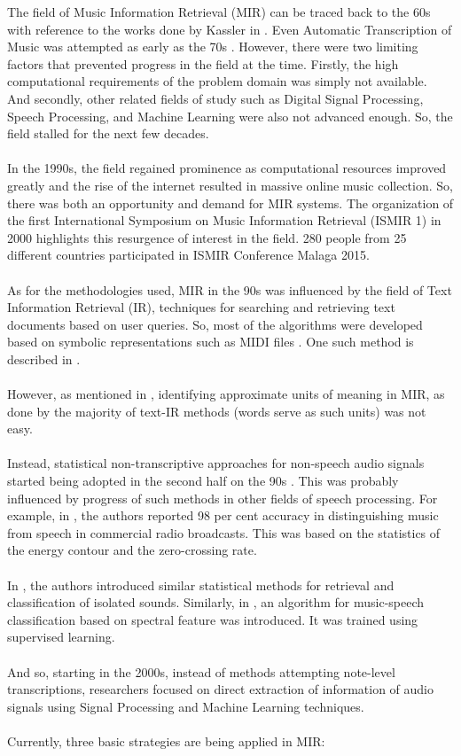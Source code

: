The field of Music Information Retrieval (MIR) can be traced back to the 60s with reference to the works done by Kassler in \cite{kassler1966}.
Even Automatic Transcription of Music was attempted as early as the 70s \cite{andel1975}. However, there were two limiting factors that prevented progress in the field at the time.
Firstly, the high computational requirements of the problem domain was simply not available. 
And secondly, other related fields of study such as Digital Signal Processing, Speech Processing, and Machine Learning were also not advanced enough.  
So, the field stalled for the next few decades.\\
\\
In the 1990s, the field regained prominence as computational resources improved greatly and the rise of the internet resulted in massive online music collection. So, there was both an opportunity and demand for MIR systems.
The organization of the first International Symposium on Music Information Retrieval (ISMIR 1) in 2000 highlights this resurgence of interest in the field. 
280 people from 25 different countries participated in ISMIR Conference Malaga 2015.\\
\\
As for the methodologies used, MIR in the 90s was influenced by the field of Text Information Retrieval (IR), techniques for searching and retrieving text documents based on user queries.
So, most of the algorithms were developed based on symbolic representations such as MIDI files \cite{Tzanetakis2002a}. One such method is described in \cite{alghoniemy1999}.\\
\\
However, as mentioned in \cite{byrd2002}, identifying approximate units of meaning in MIR, as done by the majority of text-IR methods (words serve as such units) was not easy.\\
\\
Instead, statistical non-transcriptive approaches for non-speech audio signals started being adopted in the second half on the 90s \cite{Tzanetakis2002a}.
This was probably influenced by progress of such methods in other fields of speech processing. 
For example, in \cite{saunders1996}, the authors reported 98 per cent accuracy in distinguishing music from speech in commercial radio broadcasts.
This was based on the statistics of the energy contour and the zero-crossing rate.\\
\\
In \cite{wold1996}, the authors introduced similar statistical methods for retrieval and classification of isolated sounds.
Similarly, in \cite{scheirer1997}, an algorithm for music-speech classification based on spectral feature was introduced. 
It was trained using supervised learning. \\
\\
And so, starting in the 2000s, instead of methods attempting note-level transcriptions, researchers focused on direct extraction of information of audio signals using Signal Processing and Machine Learning techniques.\\
\\
Currently, three basic strategies are being applied in MIR: \cite{Casey2008}

